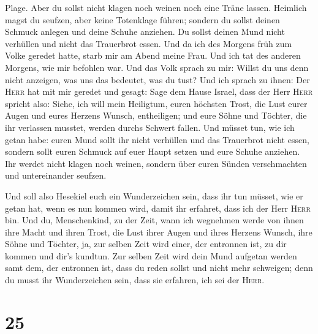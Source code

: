 Plage. Aber du sollst nicht klagen noch weinen noch eine Träne lassen.
 Heimlich magst du seufzen, aber keine Totenklage führen;
sondern du sollst deinen Schmuck anlegen und deine Schuhe anziehen. Du
sollst deinen Mund nicht verhüllen und nicht das Trauerbrot essen.
 Und da ich des Morgens früh zum Volke geredet hatte,
starb mir am Abend meine Frau. Und ich tat des anderen Morgens, wie mir
befohlen war.  Und das Volk sprach zu mir: Willst du uns
denn nicht anzeigen, was uns das bedeutet, was du tust? 
Und ich sprach zu ihnen: Der \textsc{Herr} hat mit mir geredet und
gesagt:  Sage dem Hause Israel, dass der Herr
\textsc{Herr} spricht also: Siehe, ich will mein Heiligtum, euren
höchsten Trost, die Lust eurer Augen und eures Herzens Wunsch,
entheiligen; und eure Söhne und Töchter, die ihr verlassen musstet,
werden durchs Schwert fallen.  Und müsset tun, wie ich
getan habe: euren Mund sollt ihr nicht verhüllen und das Trauerbrot
nicht essen,  sondern sollt euren Schmuck auf euer Haupt
setzen und eure Schuhe anziehen. Ihr werdet nicht klagen noch weinen,
sondern über euren Sünden verschmachten und untereinander seufzen.

 Und soll also Hesekiel euch ein Wunderzeichen sein, dass
ihr tun müsset, wie er getan hat, wenn es nun kommen wird, damit ihr
erfahret, dass ich der Herr \textsc{Herr} bin.  Und du,
Menschenkind, zu der Zeit, wann ich wegnehmen werde von ihnen ihre Macht
und ihren Trost, die Lust ihrer Augen und ihres Herzens Wunsch, ihre
Söhne und Töchter,  ja, zur selben Zeit wird einer, der
entronnen ist, zu dir kommen und dir's kundtun.  Zur
selben Zeit wird dein Mund aufgetan werden samt dem, der entronnen ist,
dass du reden sollst und nicht mehr schweigen; denn du musst ihr
Wunderzeichen sein, dass sie erfahren, ich sei der \textsc{Herr}.

\hypertarget{section-24}{%
\section{25}\label{section-24}}

